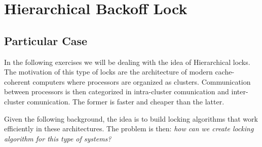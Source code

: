 \section{\textbf{Hierarchical Backoff Lock}}
\subsection{Particular Case}
\par
In the following exercises we will be dealing with the idea of Hierarchical
locks. The motivation of this type of locks are the architecture of modern
cache-coherent computers where processors are organized as clusters.
Communication between processors is then categorized in intra-cluster
comunication and inter-cluster comunication. The former is faster and cheaper
than the latter. 
\par
Given the following background, the idea is  to build locking algorithms that
work efficiently in these architectures. The problem is then: \textit{how can we
create locking algorithm for this type of systems?}
\par

